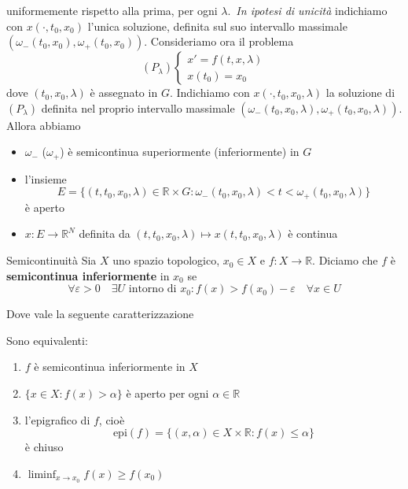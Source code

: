     uniformemente rispetto alla prima, per ogni \(\lambda\).~\emph{In ipotesi di
unicità} indichiamo con \(x(\cdot ,t_{0}, x_{0})\) l'unica soluzione, definita
sul suo intervallo massimale \({(\omega_-{(t_{0},x_{0})},
\omega_+{(t_{0},x_{0})})}\). Consideriamo ora il problema
\[
    (P_\lambda) \begin{cases}
        x' = f(t, x, \lambda) \\
        x(t_{0}) = x_{0}
    \end{cases}
\]
    dove \({(t_{0},x_{0},\lambda)}\) è assegnato in \(G\). Indichiamo con
    \(x{(\cdot ,t_{0},x_{0},\lambda)}\) la soluzione di \((P_\lambda)\) definita
    nel proprio intervallo massimale \({(\omega_-{(t_{0},x_{0},\lambda)},
    \omega_+{(t_{0},x_{0},\lambda)})}\). Allora abbiamo
\begin{theorem}
\begin{itemize}
    \item \(\omega_-\) (\(\omega_+\)) è semicontinua superiormente
        (inferiormente) in \(G\) 
    \item l'insieme 
        \[
            E = \{{(t,t_{0},x_{0},\lambda)} \in \mathbb{R}\times G :
            \omega_-{(t_{0},x_{0},\lambda)} < t < \omega_+{(t_{0},x_{0},\lambda)}\} 
        \]
        è aperto
    \item \(x : E \to \mathbb{R}^{N}\) definita da
        \({(t,t_{0},x_{0},\lambda)} \mapsto x{(t,t_{0},x_{0},\lambda)}\) è
        continua
\end{itemize}
\end{theorem}
\begin{definition}{Semicontinuità}
    Sia \(X\) uno spazio topologico, \(x_{0} \in X\) e \(f: X \to \mathbb{R}\).
    Diciamo che \(f\) è \textbf{semicontinua inferiormente} in \(x_{0}\) se
    \[
        \forall \varepsilon > 0 \quad \exists U \text{ intorno di } x_{0} :
        f(x) > f(x_{0}) - \varepsilon \quad \forall x \in U
    \]
\end{definition}
Dove vale la seguente caratterizzazione
\begin{proposition}
    Sono equivalenti: 
\begin{enumerate}[label = \roman*)]
    \item \(f\) è semicontinua inferiormente in \(X\)
    \item \(\{x \in X : f{(x)}>\alpha\} \) è aperto per ogni \(\alpha \in \mathbb{R}\) 
    \item l'epigrafico di \(f\), cioè 
        \[
            \text{epi}(f) = \{{(x, \alpha)} \in X \times \mathbb{R} : f(x) \le
            \alpha\} 
        \]
        è chiuso
    \item \(\liminf_{x \to x_{0}} f(x) \ge f(x_{0})\)
\end{enumerate}
\end{proposition}
